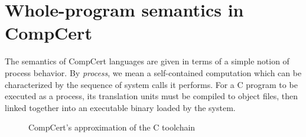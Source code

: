 \documentclass[draft,11pt]{report}
\theoremstyle{definition}
\begin{document}
\section{Whole-program semantics in CompCert} \label{sec:sem:closed} %


The semantics of CompCert languages
are given in terms of a simple notion of process behavior.
By \emph{process}, we mean a self-contained computation
which can be characterized by
the sequence of system calls it performs.
For a C program to be executed as a process,
its translation units must be compiled to object files,
then linked together
into an executable binary
loaded by the system.

\begin{figure} %
  \centering
    \caption{CompCert's approximation of the C toolchain}
    \label{fig:process}
\end{figure}
\end{document}

